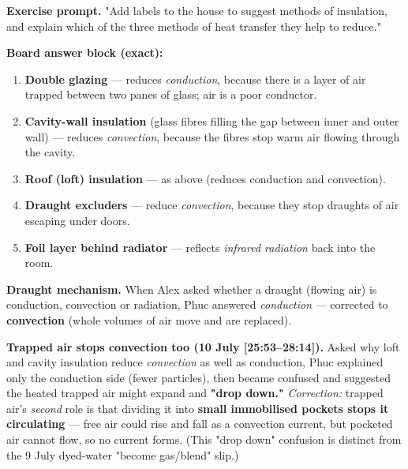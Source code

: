 \documentclass[11pt,a4paper]{article}
\newcommand{\ts}[1]{\textup{[#1]}}       %
\begin{document}
\begin{plainbox}
\textbf{Exercise prompt.} "Add labels to the house to suggest methods of insulation, and
explain which of the three methods of heat transfer they help to reduce."

\smallskip
\textbf{Board answer block (exact):}
\begin{enumerate}[leftmargin=1.6em,itemsep=1pt]
  \item \textbf{Double glazing} --- reduces \emph{conduction}, because there is a layer of
        air trapped between two panes of glass; air is a poor conductor.
  \item \textbf{Cavity-wall insulation} (glass fibres filling the gap between inner and
        outer wall) --- reduces \emph{convection}, because the fibres stop warm air flowing
        through the cavity.
  \item \textbf{Roof (loft) insulation} --- as above (reduces conduction and convection).
  \item \textbf{Draught excluders} --- reduce \emph{convection}, because they stop
        draughts of air escaping under doors.
  \item \textbf{Foil layer behind radiator} --- reflects \emph{infrared radiation} back
        into the room.
\end{enumerate}
\end{plainbox}

\begin{watchbox}
\textbf{Draught mechanism.} When Alex asked whether a draught (flowing air) is conduction,
convection or radiation, Phuc answered \emph{conduction} --- corrected to
\textbf{convection} (whole volumes of air move and are replaced).
\end{watchbox}

\begin{watchbox}
\textbf{Trapped air stops convection too (10 July \ts{25:53--28:14}).} Asked why loft and
cavity insulation reduce \emph{convection} as well as conduction, Phuc explained only the
conduction side (fewer particles), then became confused and suggested the heated trapped air
might expand and \textbf{"drop down."} \emph{Correction:} trapped air's \emph{second} role is
that dividing it into \textbf{small immobilised pockets stops it circulating} --- free air
could rise and fall as a convection current, but pocketed air cannot flow, so no current
forms. (This "drop down" confusion is distinct from the 9 July dyed-water "become gas/blend"
slip.)
\end{watchbox}
\end{document}
